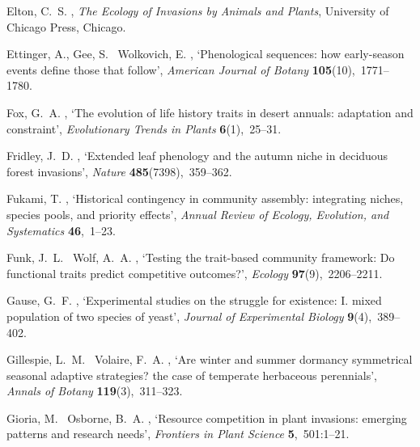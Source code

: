 \documentclass[11pt]{article}
\begin{document}
\begin{thebibliography}{xx}
Elton, C.~S.  \harvardyearright , {\em The Ecology of
  Invasions by Animals and Plants}, University of Chicago Press, Chicago.

Ettinger, A., Gee, S. \harvardand\ Wolkovich, E.  \harvardyearleft
  2018\harvardyearright , `Phenological sequences: how early-season events
  define those that follow', {\em American Journal of Botany} {\bf
  105}(10),~1771--1780.

Fox, G.~A.  \harvardyearright , `The evolution of life
  history traits in desert annuals: adaptation and constraint', {\em
  Evolutionary Trends in Plants} {\bf 6}(1),~25--31.

Fridley, J.~D.  \harvardyearright , `Extended leaf
  phenology and the autumn niche in deciduous forest invasions', {\em Nature}
  {\bf 485}(7398),~359--362.

Fukami, T.  \harvardyearright , `Historical contingency in
  community assembly: integrating niches, species pools, and priority effects',
  {\em Annual Review of Ecology, Evolution, and Systematics} {\bf 46},~1--23.

Funk, J.~L. \harvardand\ Wolf, A.~A.  \harvardyearright ,
  `Testing the trait-based community framework: Do functional traits predict
  competitive outcomes?', {\em Ecology} {\bf 97}(9),~2206--2211.

Gause, G.~F.  \harvardyearright , `Experimental studies on
  the struggle for existence: I. mixed population of two species of yeast',
  {\em Journal of Experimental Biology} {\bf 9}(4),~389--402.

Gillespie, L.~M. \harvardand\ Volaire, F.~A.  \harvardyearright , `Are winter and summer dormancy symmetrical seasonal
  adaptive strategies? the case of temperate herbaceous perennials', {\em
  Annals of Botany} {\bf 119}(3),~311--323.

Gioria, M. \harvardand\ Osborne, B.~A.  \harvardyearleft 2014\harvardyearright
  , `Resource competition in plant invasions: emerging patterns and research
  needs', {\em Frontiers in Plant Science} {\bf 5},~501:1--21.


\end{thebibliography}
\end{document}
